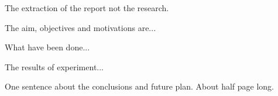 %

The extraction of the report not the research.

The aim, objectives and motivations are... 

What have been done...

The results of experiment...

One sentence about the conclusions and future plan.
About half page long.

